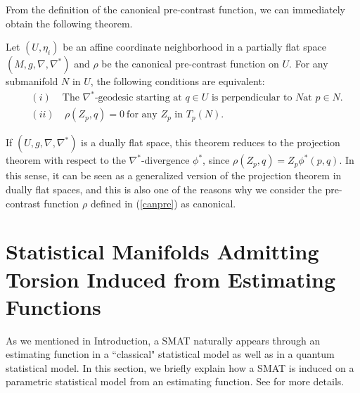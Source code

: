 \documentclass[graybox]{svmult}
\begin{document}
From the definition of the canonical pre-contrast function, we can immediately obtain
the following theorem.
%
\begin{corollary}
   Let $(U,\eta_i)$ be an affine coordinate neighborhood in a partially flat space 
   $(M,g,\nabla,\nabla^{\ast})$ and $\rho$ be the canonical pre-contrast function 
   on $U$. For any submanifold $N$ in $U$, the following
   conditions are equivalent:
%
\begin{eqnarray*}
   &(i)& \mbox{The $\nabla^{\ast}$-geodesic starting at $q \in U$ is perpendicular to $N$
               at $p \in N$}. \\
   &(ii)& \ \rho(Z_p, q) = 0 \ \mbox{for any $Z_p$ in $T_p(N)$.} \label{gpthm}
\end{eqnarray*}
\end{corollary}
%
If $(U,g,\nabla,\nabla^{\ast})$ is a dually flat space, this theorem reduces to the
projection theorem with respect to the $\nabla^{\ast}$-divergence $\phi^{\ast}$, since
$\rho(Z_p, q)=Z_p\phi^{\ast}(p,q)$.
In this sense, it can be seen as a generalized version of the projection theorem in
dually flat spaces, and this is also one of the reasons why we consider the pre-contrast
function $\rho$ defined in (\ref{canpre}) as canonical.

\section{Statistical Manifolds Admitting Torsion Induced from Estimating Functions}
\label{sec:5}
As we mentioned in Introduction, a SMAT naturally appears through an estimating function in
a ``classical" statistical model as well as in a quantum statistical model. In this section,
we briefly explain how a SMAT is induced on a parametric statistical model from an estimating
function. See \cite{HM} for more details.
\end{document}
